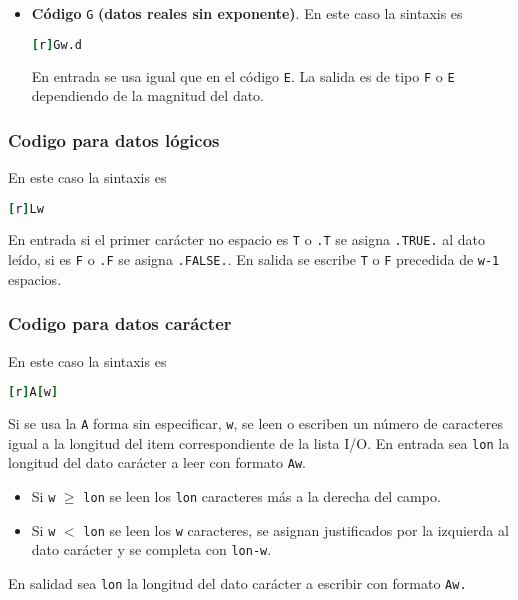 \begin{itemize}
	\item \textbf{Código} \texttt{G} \textbf{(datos reales sin exponente)}. En este caso la sintaxis es
	
	\begin{lstlisting}[language=Fortran]
		[r]Gw.d
	\end{lstlisting}

	En entrada se usa igual que en el código {\tt E}. La salida es de tipo {\tt F} o {\tt E} dependiendo de la magnitud del dato.
\end{itemize}

\subsubsection{Codigo para datos lógicos}
En este caso la sintaxis es
	
\begin{lstlisting}[language=Fortran]
	[r]Lw
\end{lstlisting}

En entrada si el primer carácter no espacio es {\tt T} o {\tt .T} se asigna {\tt .TRUE.} al dato leído, si es {\tt F} o {\tt .F} se asigna {\tt .FALSE.}. En salida se escribe {\tt T} o {\tt F} precedida de {\tt w-1} espacios.

\subsubsection{Codigo para datos carácter}
En este caso la sintaxis es
	
\begin{lstlisting}[language=Fortran]
	[r]A[w]
\end{lstlisting}

Si se usa la {\tt A} forma sin especificar, {\tt w}, se leen o escriben un número de caracteres igual a la longitud del item correspondiente de la lista I/O. En entrada sea {\tt lon} la longitud del dato carácter a leer con formato {\tt Aw}. 

\begin{itemize}
	\item Si {\tt w} $\geq$ {\tt lon} se leen los {\tt lon} caracteres más a la derecha del campo.
	\item Si {\tt w} $<$ {\tt lon} se leen los {\tt w} caracteres, se asignan justificados por la izquierda al dato carácter y se completa con {\tt lon-w}.
\end{itemize}
En salidad sea {\tt lon} la longitud del dato carácter a escribir con formato {\tt Aw.}

